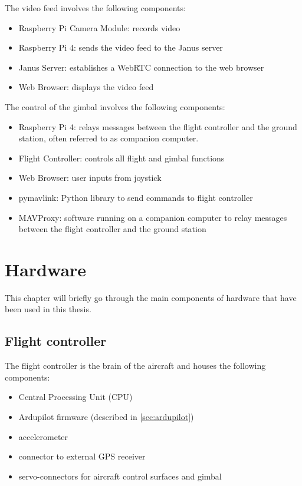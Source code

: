 \documentclass[nofilelist]{cslthse-msc}
\begin{document}
The video feed involves the following components:
\begin{itemize}
   \item Raspberry Pi Camera Module: records video
   \item Raspberry Pi 4: sends the video feed to the Janus server
   \item Janus Server: establishes a WebRTC connection to the web browser
   \item Web Browser: displays the video feed
\end{itemize}

The control of the gimbal involves the following components:
\begin{itemize}
   \item Raspberry Pi 4: relays messages between the flight controller and the ground station, often referred to as companion computer.
   \item Flight Controller: controls all flight and gimbal functions
   \item Web Browser: user inputs from joystick
   \item pymavlink: Python library to send commands to flight controller
   \item MAVProxy: software running on a companion computer to relay messages between the flight controller and the ground station
\end{itemize}

\section{Hardware}
This chapter will briefly go through the main components of hardware that have been used in this thesis.

\subsection{Flight controller}
The flight controller is the brain of the aircraft and houses the following components:
\begin{itemize}
   \item Central Processing Unit (CPU)
   \item Ardupilot firmware (described in \ref*{sec:ardupilot})
   \item accelerometer
   \item connector to external GPS receiver
   \item servo-connectors for aircraft control surfaces and gimbal
\end{itemize}
   
\end{document}
